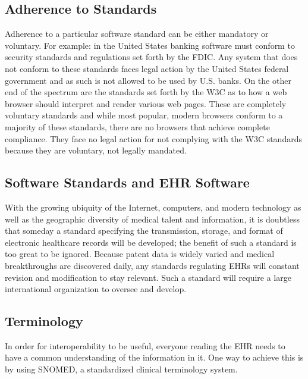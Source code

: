 \documentclass[14pt]{article}
\begin{document}

\subsection{Adherence to Standards}
Adherence to a particular software standard can be either mandatory or voluntary. For example: in the United States banking software must conform to security standards and regulations set forth by the \gls{FDIC}. Any system that does not conform to these standards faces legal action by the United States federal government and as such is not allowed to be used by U.S. banks. On the other end of the spectrum are the standards set forth by the \gls{W3C} as to how a web browser should interpret and render various web pages. These are completely voluntary standards and while most popular, modern browsers conform to a majority of these standards, there are no browsers that achieve complete compliance. They face no legal action for not complying with the \gls{W3C} standards because they are voluntary, not legally mandated.

\subsection{Software Standards and EHR Software}
With the growing ubiquity of the Internet, computers, and modern technology as well as the geographic diversity of medical talent and information, it is doubtless that someday a standard specifying the transmission, storage, and format of electronic healthcare records will be developed; the benefit of such a standard is too great to be ignored. Because patent data is widely varied and medical breakthroughs are discovered daily, any standards regulating \glspl{EHR} will constant revision and modification to stay relevant. Such a standard will require a large international organization to oversee and develop.


\subsection{Terminology}
In order for interoperability to be useful, everyone reading the \gls{EHR} needs to have a common understanding of the information in it. One way to achieve this is by using \gls{SNOMED}, a standardized clinical terminology system.
\end{document}

